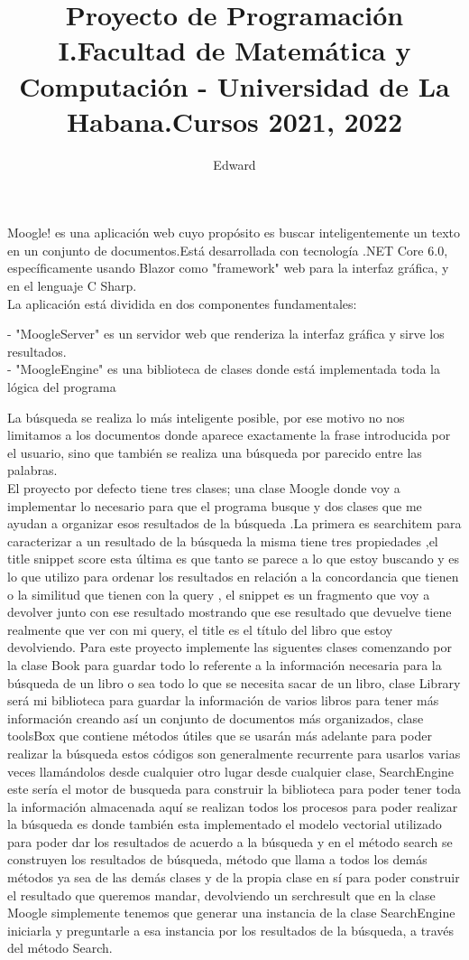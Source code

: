 \documentclass[a4paper,12pt]{article}
\author{Edward}
\title{Proyecto de Programación I.Facultad de Matemática y Computación - Universidad de La Habana.Cursos 2021, 2022}
\begin{document}
\maketitle
Moogle! es una aplicaci\'on web cuyo prop\'osito es buscar inteligentemente un
texto en un conjunto de documentos.Est\'a desarrollada con tecnolog\'ia .NET Core 6.0,
específicamente usando Blazor como "framework" web para la interfaz gr\'afica, y en el lenguaje C Sharp.\\
 La aplicación está dividida en dos componentes fundamentales:

- "MoogleServer" es un servidor web que renderiza la interfaz gr\'afica y sirve los resultados.\\
- "MoogleEngine" es una biblioteca de clases donde está implementada toda la l\'ogica del programa

La b\'usqueda se realiza lo m\'as inteligente posible, por ese motivo no nos limitamos a 
los documentos donde aparece exactamente la frase introducida por el usuario, sino que tambi\'en se realiza una b\'usqueda por parecido entre las palabras.\\
 

El proyecto por defecto tiene tres clases; una clase Moogle donde voy a implementar lo necesario para
que el programa busque y dos clases que me ayudan a organizar esos resultados de la búsqueda .La
primera es searchitem para caracterizar a un resultado de la búsqueda la misma tiene tres
propiedades ,el title snippet score esta última es que tanto se parece a lo que estoy buscando y es lo que 
utilizo para ordenar los resultados en relación a la concordancia que tienen o la similitud que tienen con
la query , el snippet es un fragmento que voy a devolver junto con ese resultado mostrando que ese
resultado que devuelve tiene realmente que ver con mi query, el title es el título del libro que estoy
devolviendo.
Para este proyecto implemente las siguentes clases comenzando por la clase Book  para guardar todo lo
referente a la información necesaria para la búsqueda de un libro o sea todo lo que se necesita sacar de
un libro, clase Library será mi biblioteca para guardar la información de varios libros para tener más
información creando así un conjunto de documentos más organizados, clase toolsBox que contiene
métodos útiles que se usarán más adelante para poder realizar la búsqueda estos códigos son
generalmente recurrente para usarlos varias veces llamándolos desde cualquier otro lugar desde
cualquier clase, SearchEngine este sería el motor de busqueda para construir la biblioteca para poder
tener toda la información almacenada aquí se realizan todos los procesos para poder realizar la
búsqueda es donde también esta implementado el modelo vectorial utilizado para poder dar los
resultados de acuerdo a la búsqueda y en el método search se construyen los resultados de búsqueda,
método que llama a todos los demás métodos ya sea de las demás clases y de la propia clase en sí para
poder construir el resultado que queremos mandar, devolviendo un serchresult que en la clase Moogle
simplemente tenemos que generar una instancia de la clase SearchEngine iniciarla y preguntarle a esa
instancia por los resultados de la búsqueda, a través del método Search.\\
\end{document}
